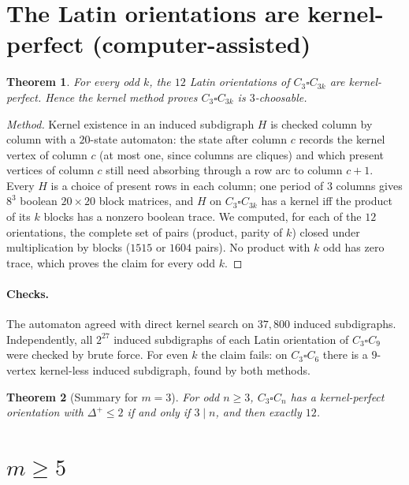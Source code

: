 \documentclass[11pt]{article}
\theoremstyle{plain}
\newtheorem{theorem}{Theorem}
\theoremstyle{definition}
\theoremstyle{remark}
\begin{document}
\section{The Latin orientations are kernel-perfect (computer-assisted)}

\begin{theorem}\label{thm:if}
For every odd $k$, the $12$ Latin orientations of $C_3\square C_{3k}$ are kernel-perfect.
Hence the kernel method proves $C_3\square C_{3k}$ is $3$-choosable.
\end{theorem}

\begin{proof}[Method]
Kernel existence in an induced subdigraph $H$ is checked column by column with a
$20$-state automaton: the state after column $c$ records the kernel vertex of column $c$
(at most one, since columns are cliques) and which present vertices of column $c$ still
need absorbing through a row arc to column $c+1$. Every $H$ is a choice of present rows
in each column; one period of $3$ columns gives $8^3$ boolean $20\times20$ block matrices,
and $H$ on $C_3\square C_{3k}$ has a kernel iff the product of its $k$ blocks has a
nonzero boolean trace. We computed, for each of the $12$ orientations, the complete set
of pairs (product, parity of $k$) closed under multiplication by blocks ($1515$ or $1604$
pairs). No product with $k$ odd has zero trace, which proves the claim for every odd $k$.
\end{proof}

\paragraph{Checks.} The automaton agreed with direct kernel search on $37{,}800$ induced
subdigraphs. Independently, all $2^{27}$ induced subdigraphs of each Latin orientation of
$C_3\square C_9$ were checked by brute force. For even $k$ the claim fails: on
$C_3\square C_6$ there is a $9$-vertex kernel-less induced subdigraph, found by both
methods.

\begin{theorem}[Summary for $m=3$]
For odd $n\ge3$, $C_3\square C_n$ has a kernel-perfect orientation with $\Delta^+\le2$ if
and only if $3\mid n$, and then exactly $12$.
\end{theorem}

\section{\texorpdfstring{$m\ge5$}{m >= 5}}
\end{document}
